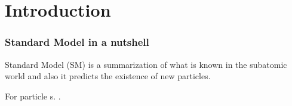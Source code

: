 \chapter{Introduction}
\label{label:intro}

\subsection{Standard Model in a nutshell}
Standard Model (SM) is a summarization of what is known in the subatomic world and also it predicts 
the existence of new particles. 

For particle s. .  
